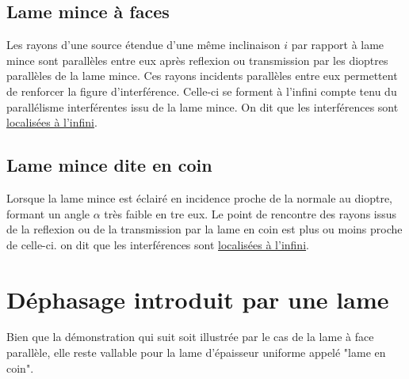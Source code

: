 \documentclass[a4paper,12pt]{article}
\theoremstyle{StyleTheo_will}
\theoremstyle{remark}
\begin{document}
\subsection{Lame mince à faces}

Les rayons d'une source étendue d'une même inclinaison $i$ par rapport à lame mince sont parallèles entre eux après reflexion ou transmission par les dioptres parallèles de la lame mince. Ces rayons incidents parallèles entre eux permettent de renforcer la figure d'interférence. Celle-ci se forment à l'infini compte tenu du parallélisme interférentes issu de la lame mince. On dit que les interférences sont \underline{localisées à l'infini}.

\subsection{Lame mince dite en coin}

Lorsque la lame mince est éclairé en incidence proche de la normale au dioptre, formant un angle $\alpha$ très faible en tre eux. Le point de rencontre des rayons issus de la reflexion ou de la transmission par la lame en coin est plus ou moins proche de celle-ci. on dit que les interférences sont \underline{localisées à l'infini}.

\section{Déphasage introduit par une lame}

Bien que la démonstration qui suit soit illustrée par le cas de la lame à face parallèle, elle reste vallable pour la lame d'épaisseur uniforme appelé "lame en coin".
\end{document}

